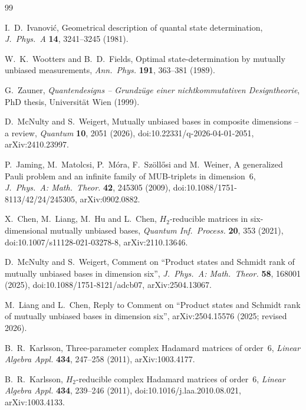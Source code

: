 \documentclass[11pt]{article}
\numberwithin{equation}{section}
\theoremstyle{plain}
\theoremstyle{definition}
\theoremstyle{remark}
\begin{document}
\begin{thebibliography}{99}

I.~D.~Ivanovi\'c, Geometrical description of quantal state determination, \emph{J.\ Phys.\ A} \textbf{14}, 3241--3245 (1981).

W.~K.~Wootters and B.~D.~Fields, Optimal state-determination by mutually unbiased measurements, \emph{Ann.\ Phys.} \textbf{191}, 363--381 (1989).

G.~Zauner, \emph{Quantendesigns -- Grundz\"uge einer nichtkommutativen Designtheorie}, PhD thesis, Universit\"at Wien (1999).

D.~McNulty and S.~Weigert, Mutually unbiased bases in composite dimensions -- a review, \emph{Quantum} \textbf{10}, 2051 (2026), doi:10.22331/q-2026-04-01-2051, arXiv:2410.23997.

P.~Jaming, M.~Matolcsi, P.~M\'ora, F.~Sz\"oll\H{o}si and M.~Weiner, A generalized Pauli problem and an infinite family of MUB-triplets in dimension~6, \emph{J.\ Phys.\ A: Math.\ Theor.} \textbf{42}, 245305 (2009), doi:10.1088/1751-8113/42/24/245305, arXiv:0902.0882.

X.~Chen, M.~Liang, M.~Hu and L.~Chen, $H_2$-reducible matrices in six-dimensional mutually unbiased bases, \emph{Quantum Inf.\ Process.} \textbf{20}, 353 (2021), doi:10.1007/s11128-021-03278-8, arXiv:2110.13646.

D.~McNulty and S.~Weigert, Comment on ``Product states and Schmidt rank of mutually unbiased bases in dimension six'', \emph{J.\ Phys.\ A: Math.\ Theor.} \textbf{58}, 168001 (2025), doi:10.1088/1751-8121/adcb07, arXiv:2504.13067.

M.~Liang and L.~Chen, Reply to Comment on ``Product states and Schmidt rank of mutually unbiased bases in dimension six'', arXiv:2504.15576 (2025; revised 2026).

B.~R.~Karlsson, Three-parameter complex Hadamard matrices of order~6, \emph{Linear Algebra Appl.} \textbf{434}, 247--258 (2011), arXiv:1003.4177.

B.~R.~Karlsson, $H_2$-reducible complex Hadamard matrices of order~6, \emph{Linear Algebra Appl.} \textbf{434}, 239--246 (2011), doi:10.1016/j.laa.2010.08.021, arXiv:1003.4133.


\end{thebibliography}
\end{document}
